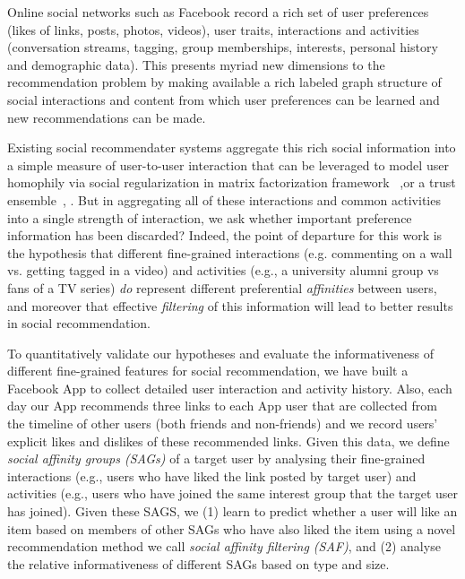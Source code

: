 
\label{sec:introduction}

Online social networks such as Facebook record a rich set of user
preferences (likes of links, posts, photos, videos), user traits,
interactions and activities (conversation streams, tagging, group
memberships, interests, personal history and demographic data).  This
presents myriad new dimensions to the recommendation problem by making
available a rich labeled graph structure of social interactions and
content from which user preferences can be learned and new
recommendations can be made.

Existing social recommendater systems aggregate this
rich social information into a simple measure of user-to-user interaction 
that can be leveraged to model user homophily via social
regularization in matrix factorization framework ~\cite{lla,socinf,sr,rrmf, Noel2012NOF},or a trust
ensemble~\cite{ste},
.  But in aggregating all of these
interactions and common activities into a single strength of
interaction, we ask whether important preference information has been
discarded?  Indeed, the point of departure for this work is the
hypothesis that different fine-grained interactions (e.g. commenting
on a wall vs. getting tagged in a video) and activities (e.g., a
university alumni group vs fans of a TV series) \emph{do} represent different
preferential {\em affinities} between users, and moreover that effective
{\em filtering} of this information will lead to better results in
social recommendation.


To quantitatively validate our hypotheses and evaluate the
informativeness of different fine-grained features for social
recommendation, we have built a Facebook App to collect detailed user
interaction and activity history.
Also, each day our App recommends three links to each App user 
that are collected from the timeline of other users (both friends and
non-friends) and we record users' explicit likes and dislikes of these
recommended links. Given this data, we define \emph{social affinity
groups (SAGs)} of a target user by analysing their fine-grained
interactions (e.g., users who have liked the link posted by target user)
and activities (e.g., users who have joined the same
interest group that the target user has joined).  Given these SAGS, we
(1) learn to predict whether a user will like an item based on members
of other SAGs who have also liked the item using a novel
recommendation method we call {\em social affinity filtering (SAF)},
and (2) analyse the relative informativeness of different SAGs based
on type and size.


